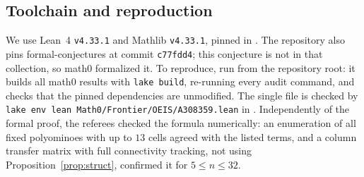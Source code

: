 \documentclass[11pt]{amsart}
\theoremstyle{plain}
\theoremstyle{definition}
\begin{document}
\subsection*{Toolchain and reproduction}
We use Lean~4 \cite{Lean4} \texttt{v4.33.1} and Mathlib \cite{Mathlib} \texttt{v4.33.1}, pinned in . The repository also pins formal-conjectures \cite{FC} at commit \texttt{c77fdd4}; this conjecture is not in that collection, so math0 formalized it. To reproduce, run  from the repository root: it builds all math0 results with \texttt{lake build}, re-running every audit command, and checks that the pinned dependencies are unmodified. The single file is checked by \texttt{lake env lean Math0/Frontier/OEIS/A308359.lean} in . Independently of the formal proof, the referees checked the formula numerically: an enumeration of all fixed polyominoes with up to $13$ cells agreed with the listed terms, and a column transfer matrix with full connectivity tracking, not using Proposition~\ref{prop:struct}, confirmed it for $5\le n\le32$.
\end{document}
